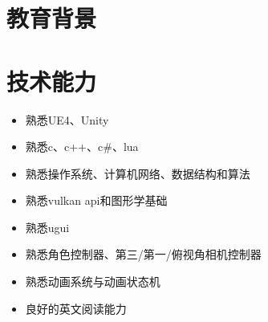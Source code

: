 \documentclass{resume}
\begin{document}



\section{教育背景}

\section{技术能力}
\begin{itemize}[parsep=0.2ex]
  \item 熟悉UE4、Unity
  \item 熟悉c、c++、c\#、lua
  \item 熟悉操作系统、计算机网络、数据结构和算法
  \item 熟悉vulkan api和图形学基础
  \item 熟悉ugui
  \item 熟悉角色控制器、第三/第一/俯视角相机控制器
  \item 熟悉动画系统与动画状态机
  \item 良好的英文阅读能力
\end{itemize}

\end{document}
